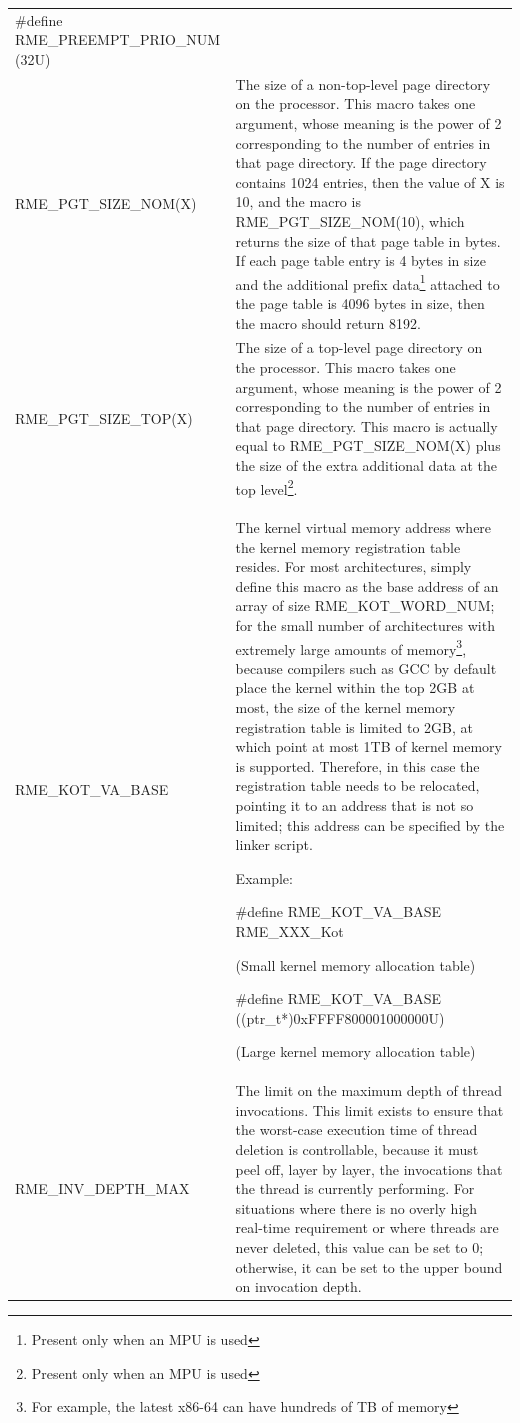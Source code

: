 \begin{xltabular}{\textwidth}{@{}>{\hsize\raggedright\arraybackslash}X>{\hsize\raggedright\arraybackslash}X@{}}
\#define RME\_PREEMPT\_PRIO\_NUM (32U)\strut
\tabularnewline
RME\_PGT\_SIZE\_NOM(X) &
The size of a non-top-level page directory on the processor. This macro takes one argument, whose meaning is the power of 2 corresponding to the number of entries in that page directory. If the page directory contains 1024 entries, then the value of X is 10, and the macro is RME\_PGT\_SIZE\_NOM(10), which returns the size of that page table in bytes. If each page table entry is 4 bytes in size and the additional prefix data\footnote{Present only when an MPU is used} attached to the page table is 4096 bytes in size, then the macro should return 8192.\tabularnewline
RME\_PGT\_SIZE\_TOP(X) &
The size of a top-level page directory on the processor. This macro takes one argument, whose meaning is the power of 2 corresponding to the number of entries in that page directory. This macro is actually equal to RME\_PGT\_SIZE\_NOM(X) plus the size of the extra additional data at the top level\footnote{Present only when an MPU is used}.\tabularnewline
RME\_KOT\_VA\_BASE\strut
 & The kernel virtual memory address where the kernel memory registration table resides. For most architectures, simply define this macro as the base address of an array of size RME\_KOT\_WORD\_NUM; for the small number of architectures with extremely large amounts of memory\footnote{For example, the latest x86-64 can have hundreds of TB of memory}, because compilers such as GCC by default place the kernel within the top 2GB at most, the size of the kernel memory registration table is limited to 2GB, at which point at most 1TB of kernel memory is supported. Therefore, in this case the registration table needs to be relocated, pointing it to an address that is not so limited; this address can be specified by the linker script.

Example:

\#define RME\_KOT\_VA\_BASE RME\_XXX\_Kot

(Small kernel memory allocation table)

\#define RME\_KOT\_VA\_BASE ((ptr\_t*)0xFFFF800001000000U)

(Large kernel memory allocation table)\strut
\tabularnewline
RME\_INV\_DEPTH\_MAX\strut
 & The limit on the maximum depth of thread invocations. This limit exists to ensure that the worst-case execution time of thread deletion is controllable, because it must peel off, layer by layer, the invocations that the thread is currently performing. For situations where there is no overly high real-time requirement or where threads are never deleted, this value can be set to 0; otherwise, it can be set to the upper bound on invocation depth.


\end{xltabular}
